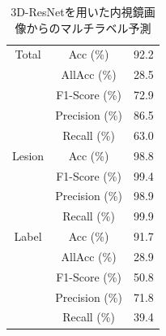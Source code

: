 \begin{table}[tb]
    \caption[]{3D-ResNetを用いた内視鏡画像からのマルチラベル予測}
    \label{tb:1}
    \centering
    \normalsize
    \begin{tabular}{c|c|r} \hline
        Total & Acc (\%) & 92.2 \\ \cline{2-3}
         & AllAcc (\%) & 28.5 \\ \cline{2-3}
         & F1-Score (\%) & 72.9 \\ \cline{2-3}
         & Precision (\%) & 86.5 \\ \cline{2-3}
         & Recall (\%) & 63.0 \\ \hline
        Lesion & Acc (\%) & 98.8 \\ \cline{2-3}
         & F1-Score (\%) & 99.4 \\ \cline{2-3}
         & Precision (\%) & 98.9 \\ \cline{2-3}
         & Recall (\%) & 99.9 \\ \hline
        Label & Acc (\%) & 91.7 \\ \cline{2-3}
         & AllAcc (\%) & 28.9 \\ \cline{2-3}
         & F1-Score (\%) & 50.8 \\ \cline{2-3}
         & Precision (\%) & 71.8 \\ \cline{2-3}
         & Recall (\%) & 39.4 \\ \hline
    \end{tabular}
\end{table}
